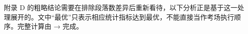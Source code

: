 附录 D 的粗略结论需要在排除段落数差异后重新看待，以下分析正是基于这一处理展开的。文中“最优”只表示相应统计指标达到最优，不能直接当作考场执行顺序。完整计算由  →\allowbreak{}  完成。